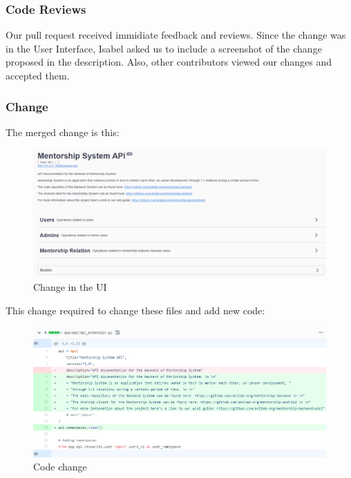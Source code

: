 \documentclass{article}
\begin{document}
\subsubsection{Code Reviews}
\hspace{0.5cm}Our pull request received immidiate feedback and reviews. Since the change was in the User Interface, Isabel asked us to include a screenshot of the change proposed in the description. Also, other contributors viewed our changes and accepted them. 
\subsubsection{Change}
\hspace{0.5cm}The merged change is this:
\begin{figure}[tph!]
\centerline{\includegraphics[totalheight=8cm, width=18cm]{issue482-UI.png}}
    \caption{Change in the UI}
    \label{fig:verticalcell}
\end{figure}
\vfill
\clearpage
\hspace{0.5cm}This change required to change these files and add new code:
\begin{figure}[tph!]
\centerline{\includegraphics[totalheight=8cm, width=18cm]{change-issue482.png}}
    \caption{Code change}
    \label{fig:verticalcell}
\end{figure}
\end{document}

